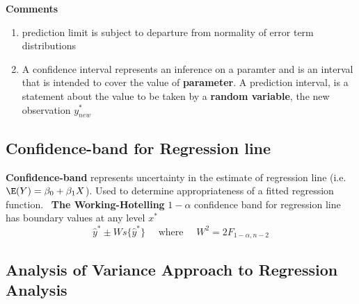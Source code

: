 \documentclass[11pt]{article}
\begin{document}
\begin{defn*}
	\textbf{Comments}
	\begin{enumerate}
		\item prediction limit is subject to departure from normality of error term distributions
		\item A confidence interval represents an inference on a paramter and is an interval that is intended to cover the value of \textbf{parameter}. A prediction interval, is a statement about the value to be taken by a \textbf{random variable}, the new observation $y^*_{new}$
	\end{enumerate}
\end{defn*}
 

\subsection*{Confidence-band for Regression line} 

\begin{defn*}
	\textbf{Confidence-band} represents uncertainty in the estimate of regression line (i.e. $\E(Y) = \beta_0 + \beta_1 X$). Used to determine appropriateness of a fitted regression function. \
	\textbf{The Working-Hotelling} $1-\alpha$ confidence band for regression line has boundary values at any level $x^*$
	\[
		\hat{y}^* \pm Ws\{ \hat{y}^*\} \quad \text{ where } \quad W^2 = 2F_{1-\alpha, n-2}
 	\]
\end{defn*}


\subsection*{Analysis of Variance Approach to Regression Analysis}
\end{document}

